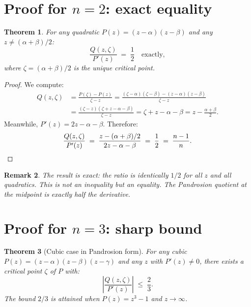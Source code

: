 \documentclass[11pt,a4paper]{article}
\newtheorem{theorem}{Theorem}[section]
\newtheorem{remark}[theorem]{Remark}
\begin{document}
\section{Proof for $n = 2$: exact equality}

\begin{theorem}
For any quadratic $P(z) = (z - \alpha)(z - \beta)$ and any $z \ne (\alpha + \beta)/2$:
\begin{equation}
\frac{Q(z, \zeta)}{P'(z)} \;=\; \frac{1}{2} \quad \text{exactly},
\end{equation}
where $\zeta = (\alpha + \beta)/2$ is the unique critical point.
\end{theorem}

\begin{proof}
We compute:
\begin{align*}
Q(z, \zeta) &= \frac{P(\zeta) - P(z)}{\zeta - z}
            = \frac{(\zeta - \alpha)(\zeta - \beta) - (z - \alpha)(z - \beta)}{\zeta - z} \\
            &= \frac{(\zeta - z)(\zeta + z - \alpha - \beta)}{\zeta - z}
            = \zeta + z - \alpha - \beta = z - \frac{\alpha + \beta}{2}.
\end{align*}
Meanwhile, $P'(z) = 2z - \alpha - \beta$. Therefore:
\begin{equation*}
\frac{Q(z, \zeta)}{P'(z)} \;=\; \frac{z - (\alpha + \beta)/2}{2z - \alpha - \beta} \;=\; \frac{1}{2} \;=\; \frac{n - 1}{n}. \qedhere
\end{equation*}
\end{proof}

\begin{remark}
The result is \emph{exact}: the ratio is identically $1/2$ for all $z$ and all quadratics. This is not an inequality but an equality. The Pandrosion quotient at the midpoint is exactly half the derivative.
\end{remark}

\section{Proof for $n = 3$: sharp bound}

\begin{theorem}[Cubic case in Pandrosion form]
For any cubic $P(z) = (z - \alpha)(z - \beta)(z - \gamma)$ and any $z$ with $P'(z) \ne 0$, there exists a critical point $\zeta$ of $P$ with:
\begin{equation}
\left|\frac{Q(z, \zeta)}{P'(z)}\right| \;\le\; \frac{2}{3}.
\end{equation}
The bound $2/3$ is attained when $P(z) = z^3 - 1$ and $z \to \infty$.
\end{theorem}
\end{document}
